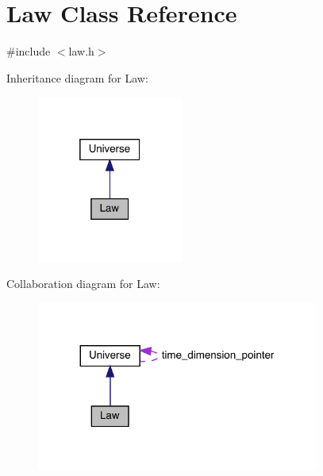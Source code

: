 \hypertarget{class_law}{}\section{Law Class Reference}
\label{class_law}


{\ttfamily \#include $<$law.\+h$>$}



Inheritance diagram for Law\+:\nopagebreak
\begin{figure}[H]
\begin{center}
\leavevmode
\includegraphics[width=136pt]{class_law__inherit__graph}
\end{center}
\end{figure}


Collaboration diagram for Law\+:\nopagebreak
\begin{figure}[H]
\begin{center}
\leavevmode
\includegraphics[width=263pt]{class_law__coll__graph}
\end{center}
\end{figure}
